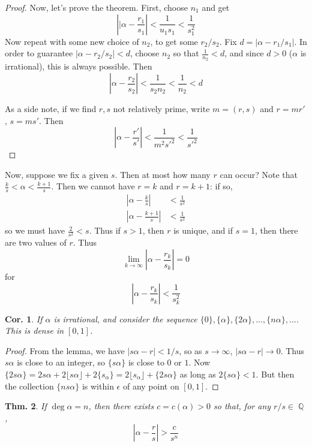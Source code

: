 \documentclass[12pt, a4paper]{book}
\DeclareMathOperator{\Q}{\mathbb{Q}}
\newtheorem{theorem}{Thm.}[section]
\newtheorem{corollary}[theorem]{Cor.}
\theoremstyle{nonumberplain}
\newtheorem{proof}{Proof}
\begin{document}
\begin{proof}
    Now, let's prove the theorem.
    First, choose $n_1$ and get
    \[\left\lvert|\alpha-\frac{r_1}{s_1}\right\rvert<\frac{1}{u_1s_1}<\frac{1}{s_1^2}\]
    Now repeat with some new choice of $n_2$, to get some $r_2/s_2$.
    Fix $d=|\alpha-r_1/s_1|$.
    In order to guarantee $|\alpha-r_2/s_2|<d$, choose $n_2$ so that $\frac{1}{n_2}<d$, and since $d>0$ ($\alpha$ is irrational), this is always possible.
    Then
    \[\left\lvert\alpha-\frac{r_2}{s_2}\right\rvert <\frac{1}{s_2n_2}<\frac{1}{n_2}<d\]

    As a side note, if we find $r,s$ not relatively prime, write $m=(r,s)$ and $r=mr'$, $s=ms'$.
    Then
    \[\left\lvert\alpha-\frac{r'}{s'}\right\rvert<\frac{1}{m^2s'^2}<\frac{1}{s'^2}\]
\end{proof}
Now, suppose we fix a given $s$.
Then at most how many $r$ can occur?
Note that $\frac{k}{s}<\alpha<\frac{k+1}{s}$.
Then we cannot have $r=k$ and $r=k+1$: if so,
\begin{align*}
    \left\lvert\alpha-\frac{k}{s}\right\rvert&<\frac{1}{s^2}\\
    \left\lvert\alpha-\frac{k+1}{s}\right\rvert&<\frac{1}{s^2}
\end{align*}
so we must have $\frac{2}{s^2}<s$.
Thus if $s>1$, then $r$ is unique, and if $s=1$, then there are two values of $r$.
Thus
\[\lim_{k\to\infty}\left\lvert\alpha-\frac{r_k}{s_k}\right\rvert=0\]
for
\[\left\lvert\alpha-\frac{r_k}{s_k}\right\rvert<\frac{1}{s_k^2}\]
\begin{corollary}
    If $\alpha$ is irrational, and consider the sequence $\{0\},\{\alpha\},\{2\alpha\},\ldots,\{n\alpha\},\ldots$.
    This is dense in $[0,1]$.
\end{corollary}
\begin{proof}
    From the lemma, we have $|s\alpha-r|<1/s$, so as $s\to\infty$, $|s\alpha-r|\to 0$.
    Thus $s\alpha$ is close to an integer, so $\{s\alpha\}$ is close to $0$ or $1$.
    Now $\{2s\alpha\}=2s\alpha+2\lfloor s\alpha\rfloor+2\{s_\alpha\}=2\lfloor s_\alpha\rfloor+\{2s\alpha\}$ as long as $2\{s\alpha\}<1$.
    But then the collection $\{ns\alpha\}$ is within $\epsilon$ of any point on $[0,1]$.
\end{proof}
\begin{theorem}
    If $\deg\alpha=n$, then there exists $c=c(\alpha)>0$ so that, for any $r/s\in\Q$,
    \[\left\lvert\alpha-\frac{r}{s}\right\rvert>\frac{c}{s^n}\]
\end{theorem}
\end{document}
